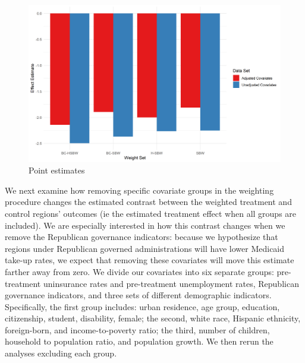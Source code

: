 \documentclass[12pt]{article}
\begin{document}
\begin{figure}[B]
\begin{center}
    \includegraphics[scale=0.6]{01_Plots/point-estimates-c1.png}
    \caption{Point estimates}
    \label{fig:estimators}
\end{center}
\end{figure}

We next examine how removing specific covariate groups in the weighting procedure changes the estimated contrast between the weighted treatment and control regions' outcomes (ie the estimated treatment effect when all groups are included). We are especially interested in how this contrast changes when we remove the Republican governance indicators: because we hypothesize that regions under Republican governed administrations will have lower Medicaid take-up rates, we expect that removing these covariates will move this estimate farther away from zero. We divide our covariates into six separate groups: pre-treatment uninsurance rates and pre-treatment unemployment rates, Republican governance indicators, and three sets of different demographic indicators. Specifically, the first group includes: urban residence, age group, education, citizenship, student, disability, female; the second, white race, Hispanic ethnicity, foreign-born, and income-to-poverty ratio; the third, number of children, household to population ratio, and population growth. We then rerun the analyses excluding each group. 
\end{document}
